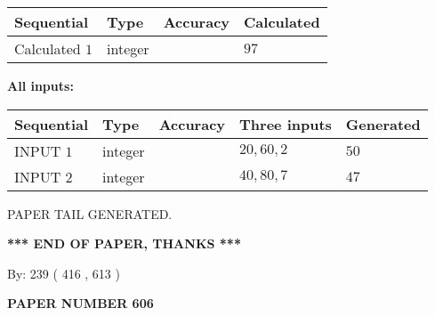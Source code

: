 \documentclass[12pt]{article}
\begin{document}
   
  
  
\noindent\begin{tabular}{|l|l|l|l|}
\hline
 Sequential & Type & Accuracy & Calculated \\ 
\hline
 
 
  Calculated $  1 $ & integer &  & 
  $ 97 $ 
 \\  \hline  
 \end{tabular}
   
   
   
   
\noindent\vspace{0.1in}\hspace{-0.08in} {\textbf{\Large{All inputs: }}}
   
   
  
  
\noindent\begin{tabular}{|l|l|l|l|l|}
\hline
 Sequential & Type & Accuracy & Three inputs & Generated \\ 
\hline
 
 
  INPUT $  1 $ & integer &  & $
 20
 , 
 60
 , 
 2
 $ & $ 50 $ 
 \\  \hline  
 
 
  INPUT $  2 $ & integer &  & $
 40
 , 
 80
 , 
 7
 $ & $ 47 $ 
 \\  \hline  
 \end{tabular}
   
   
   
   
   
   
 \vspace{0.2in}
 
   
   
\vspace{2.0in} PAPER TAIL GENERATED.
   
   
   
   
\vspace{1.0in} 
{\textbf{\large{ *** END OF PAPER, THANKS *** }}} 
   
   
\hspace{1.0in} By: 
 239 ( 416 ,  613 )
   
   
   
   
\newpage 
\setcounter{page}{ 
   606001 } 
   
   
   
   
 {\textbf{ \Large{ PAPER NUMBER  606  }}}
   
   
\vspace{0.2in}
   
   
   
\end{document}
